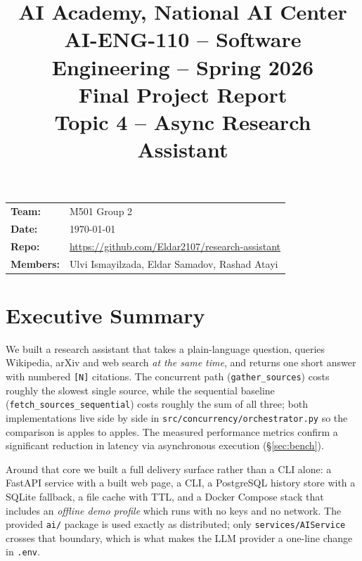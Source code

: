 \documentclass[11pt,a4paper]{article}
\title{\vspace{-1.5cm}
  \Large AI Academy, National AI Center\\[2pt]
  \large AI-ENG-110 -- Software Engineering -- Spring 2026\\[10pt]
  \textbf{\LARGE Final Project Report}\\[6pt]
  \textbf{\large Topic 4 -- Async Research Assistant}}
\author{}
\date{}
\newcommand{\code}[1]{\texttt{\small #1}}
\begin{document}
\maketitle
\thispagestyle{fancy}
\vspace{-1.8cm}

\begin{center}
\begin{tabular}{@{}ll@{}}
\textbf{Team:} & M501 Group 2 \\
\textbf{Date:} & \today \\
\textbf{Repo:} & \url{https://github.com/Eldar2107/research-assistant} \\
\textbf{Members:} & Ulvi Ismayilzada, Eldar Samadov, Rashad Atayi \\
\end{tabular}
\end{center}

\vspace{0.6cm}

\section*{Executive Summary}

We built a research assistant that takes a plain-language question, queries
Wikipedia, arXiv and web search \emph{at the same time}, and returns one short
answer with numbered \code{[N]} citations. The concurrent path
(\code{gather\_sources}) costs roughly the slowest single source, while the
sequential baseline (\code{fetch\_sources\_sequential}) costs roughly the sum of
all three; both implementations live side by side in
\code{src/concurrency/orchestrator.py} so the comparison is apples to apples.
The measured performance metrics confirm a significant reduction in latency via asynchronous execution (\S\ref{sec:bench}).

Around that core we built a full delivery surface rather than a CLI alone: a
FastAPI service with a built web page, a CLI, a PostgreSQL history store with a
SQLite fallback, a file cache with TTL, and a Docker Compose stack that includes
an \emph{offline demo profile} which runs with no keys and no network. The
provided \code{ai/} package is used exactly as distributed; only
\code{services/AIService} crosses that boundary, which is what makes the LLM
provider a one-line change in \code{.env}.

\tableofcontents
\newpage
\end{document}
